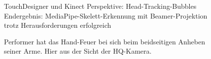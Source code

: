 \begin{figure}[htbp]
    \centering
    \caption{TouchDesigner und Kinect Perspektive: Head-Tracking-Bubbles Endergebnis: MediaPipe-Skelett-Erkennung mit Beamer-Projektion trotz Herausforderungen erfolgreich}
    \label{fig:head_result}
\end{figure}

\begin{figure}[htbp]
    \centering
    \caption{Performer hat das Hand-Feuer bei sich beim beidseitigen Anheben seiner Arme. Hier aus der Sicht der HQ-Kamera.}
    \label{fig:hand_fire_setup}
\end{figure}

